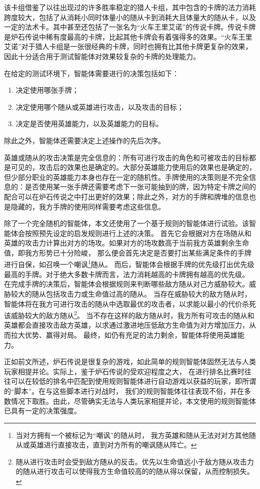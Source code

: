 该卡组借鉴了以往出现过的许多胜率稳定的猎人卡组，其中包含的卡牌的法力消耗跨度较大，包括了从消耗小同时体量小的随从卡到消耗大且体量大的随从卡，以及一定的法术卡。其中甚至还包括了一张名为“火车王里艾诺”的传说卡牌。传说卡牌是炉石传说中稀有度最高的卡牌，比起其他卡牌会有着强得多的效果。“火车王里艾诺”对于猎人卡组是一张很经典的卡牌，同时也拥有比其他卡牌更复杂的效果，因此十分适合用于测试智能体对效果较复杂的卡牌的处理能力。

在给定的测试环境下，智能体需要进行的决策包括如下：
\begin{enumerate}
\item 决定使用哪张手牌；
\item 决定使用哪个随从或英雄进行攻击，以及攻击的目标；
\item 决定是否使用英雄能力，以及英雄能力的目标。
\end{enumerate}
除此之外，智能体还需要决定上述操作的先后次序。

英雄或随从的攻击决策是完全信息的：所有可进行攻击的角色和可被攻击的目标都是可见的，攻击后的效果也是确定的。大部分英雄能力使用后的效果也是确定的，但少部分职业的英雄能力本身也存在一定的随机性。手牌使用的决策则是不完全信息的：是否使用某一张手牌还需要考虑下一张可能抽到的牌，因为特定卡牌之间的配合可以在炉石传说之中打出更好的效果；除此之外，对方的手牌和牌堆的信息也是隐藏的，我方手牌的使用同样需要考虑这些信息。

除了一个完全随机的智能体，本文还使用了一个基于规则的智能体进行试验。该智能体会按照预先设定的启发规则进行上述的决策。
首先它会根据对方在场随从和英雄的攻击力计算出对方的场攻。如果对方的场攻数高于当前我方英雄剩余生命值，即我方形势已十分险峻，
那么便会首先决定是否要打出某些满足条件的手牌进行自保，如召唤一个嘲讽\footnote{当对方拥有一个被标记为“嘲讽”的随从时，
我方英雄和随从无法对对方其他随从或英雄进行直接攻击，直到对方所有的嘲讽随从阵亡。}随从。
而后，智能体会根据手牌的优先级打出优先级最高的手牌。对于绝大多数卡牌而言，法力消耗越高的卡牌拥有越高的优先级。
在完成手牌的决策后，智能体会根据规则来判断哪些敌方随从对己方威胁较大。威胁较大的随从包括攻击力或生命值过高的随从。
当存在威胁较大的敌方随从时，智能体将在我方可进行攻击的随从中选取最优的攻击者，以求能以最小的代价杀死该威胁较大的敌方随从\footnote{随从进行攻击时会受到敌方随从的反击。优先以生命值远小于敌方随从攻击力的随从进行攻击可以使得我方生命值较高的的随从得以保留，从而控制损失。}。
当不存在这样的敌方随从时，我方所有可攻击的随从和英雄都会直接攻击敌方英雄，以求通过激进地压低敌方生命值为对方增加压力，从而拉大优势、赢得对局。
最终，如仍有充足的法力剩余，智能体将使用英雄能力。

正如前文所述，炉石传说是很复杂的游戏，如此简单的规则智能体固然无法与人类玩家相提并论。实际上，鉴于炉石传说的受欢迎程度之大，
在进行排名比赛时往往可以在较低的排名中匹配到使用规则智能体进行自动游戏以获益的玩家，即所谓的“脚本”。在与这些脚本进行对战时，
我们的规则智能体往往表现不俗，并在多数情况下取胜。由此，尽管确实无法与人类玩家相提并论，本文使用的规则智能体已具有一定的决策强度。

